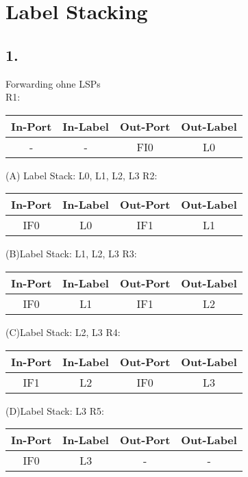 \documentclass[paper=a4, fontsize=11pt]{scrartcl}
\numberwithin{equation}{section}
\numberwithin{figure}{section}
\numberwithin{table}{section}
\begin{document}
\section{Label Stacking}
\subsection{1.}
Forwarding ohne LSPs \\

R1:\newline
\begin{tabular}{c|c|c|c}
In-Port & In-Label & Out-Port & Out-Label \\\hline
- & - & FI0 & L0\\
\end{tabular}\newline
(A) Label Stack: L0, L1, L2, L3\newline
R2:\newline
\begin{tabular}{c|c|c|c}
In-Port & In-Label & Out-Port & Out-Label \\\hline
IF0 & L0 & IF1 & L1\\
\end{tabular}\newline
(B)Label Stack: L1, L2, L3\newline
R3:\newline
\begin{tabular}{c|c|c|c}
In-Port & In-Label & Out-Port & Out-Label \\\hline
IF0 & L1 & IF1 & L2\\
\end{tabular}\newline
(C)Label Stack: L2, L3\newline
R4:\newline
\begin{tabular}{c|c|c|c}
In-Port & In-Label & Out-Port & Out-Label \\\hline
IF1 & L2 & IF0 & L3\\
\end{tabular}\newline
(D)Label Stack: L3\newline
R5:\newline
\begin{tabular}{c|c|c|c}
In-Port & In-Label & Out-Port & Out-Label \\\hline
IF0 & L3 & - & -\\
\end{tabular}\newline
\end{document}

